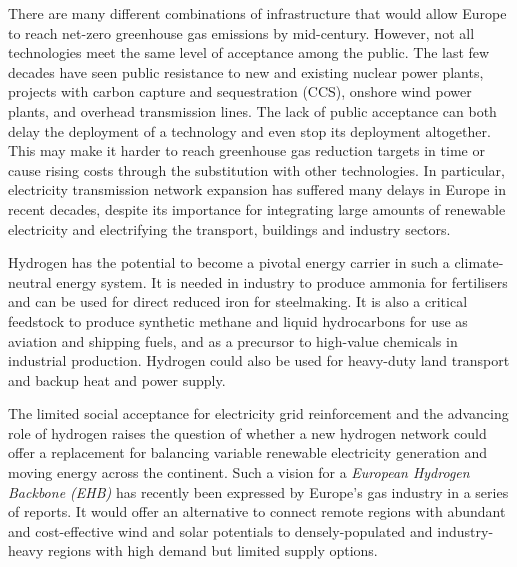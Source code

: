There are many different combinations of infrastructure that would allow Europe
to reach net-zero greenhouse gas emissions by
mid-century.\cite{pickeringDiversityOptions2022} However, not all technologies
meet the same level of acceptance among the public. The last few decades have
seen public resistance to new and existing nuclear power plants, projects with
carbon capture and sequestration (CCS), onshore wind power plants, and overhead
transmission
lines.\cite{cohenRefocussingResearch2014a,bertschPublicAcceptance2016,boudetPublicPerceptions2019a}
The lack of public acceptance can both delay the deployment of a technology and
even stop its deployment altogether.\cite{batelSocialAcceptance2013a} This may
make it harder to reach greenhouse gas reduction targets in time or cause rising
costs through the substitution with other technologies. In particular,
electricity transmission network expansion has suffered many delays in Europe in
recent decades, despite its importance for integrating large amounts of
renewable electricity and electrifying the transport, buildings and industry
sectors.\cite{schlachtbergerBenefitsCooperation2017,trondleTradeOffsGeographic2020}

Hydrogen has the potential to become a pivotal energy carrier in such a climate-neutral
energy system.\cite{hanleyRoleHydrogen2018,staffellRoleHydrogen2019a} It is
needed in industry to produce ammonia for fertilisers and can be used for
direct reduced iron for
steelmaking.\cite{wangGreeningAmmonia2018,voglPhasingOut2021} It is also a
critical feedstock to produce synthetic methane and liquid hydrocarbons for use
as aviation and shipping fuels, and as a precursor to high-value chemicals in
industrial production.\cite{lechtenbohmerDecarbonisingEnergy2016} Hydrogen could
also be used for heavy-duty land transport and backup heat and power
supply.\cite{kluschkeMarketDiffusion2019,doddsHydrogenFuel2015}

The limited social acceptance for electricity grid reinforcement and the
advancing role of hydrogen raises the question of whether a new hydrogen network
could offer a replacement for balancing variable renewable electricity
generation and moving energy across the
continent.\cite{caglayanRobustDesign2021} Such a vision for a \textit{European
Hydrogen Backbone (EHB)} has recently been expressed by Europe's gas industry in
a series of reports.
\cite{gasforclimateEuropeanHydrogen2020,gasforclimateEuropeanHydrogen2021,gasforclimateExtendingEuropean2021,gasforclimateEuropeanHydrogen2022}
It would offer an alternative to connect remote regions with abundant
and cost-effective wind and solar potentials to densely-populated and
industry-heavy regions with high demand but limited supply options.

